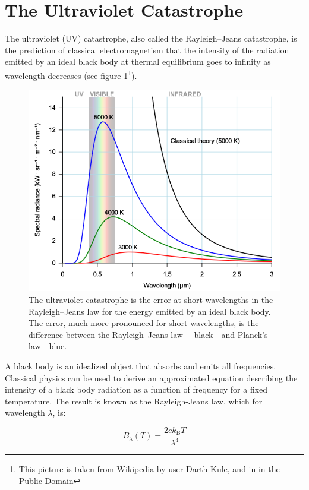 \documentclass[
  9pt,
]{extbook}
\theoremstyle{definition}
\theoremstyle{definition}
\theoremstyle{definition}
\theoremstyle{remark}
\begin{document}
\hypertarget{the-ultraviolet-catastrophe}{%
\section{The Ultraviolet Catastrophe}\label{the-ultraviolet-catastrophe}}

The ultraviolet (UV) catastrophe, also called the Rayleigh--Jeans catastrophe, is the prediction of classical electromagnetism that the intensity of the radiation emitted by an ideal black body at thermal equilibrium goes to infinity as wavelength decreases (see figure \ref{fig:Fig1c1}\footnote{This picture is taken from \href{https://en.wikipedia.org}{Wikipedia} by user Darth Kule, and in in the Public Domain}).

\begin{figure}

{\centering \includegraphics[width=0.7\linewidth]{./img/OEP_wiki0} 

}

\caption{The ultraviolet catastrophe is the error at short wavelengths in the Rayleigh–Jeans law for the energy emitted by an ideal black body. The error, much more pronounced for short wavelengths, is the difference between the Rayleigh–Jeans law —black—and Planck's law—blue.}\label{fig:Fig1c1}
\end{figure}

A black body is an idealized object that absorbs and emits all frequencies. Classical physics can be used to derive an approximated equation describing the intensity of a black body radiation as a function of frequency for a fixed temperature. The result is known as the Rayleigh-Jeans law, which for wavelength \(\lambda\), is:

\begin{equation}
B_{\lambda }(T)={\frac {2ck_{\mathrm {B} }T}{\lambda ^{4}}}
\label{eq:rjlaw}
\end{equation}
\end{document}
